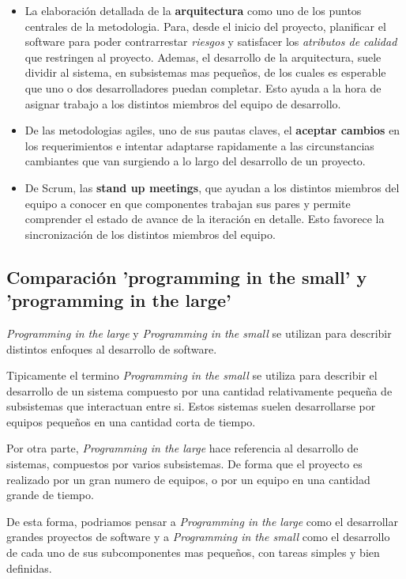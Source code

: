 \begin{itemize}
		\item La elaboración detallada de la \textbf{arquitectura} como uno de los puntos centrales de la metodologia. Para, desde el inicio del proyecto, planificar el software para poder contrarrestar \emph{riesgos} y satisfacer los \emph{atributos de calidad} que restringen al proyecto. Ademas, el desarrollo de la arquitectura, suele dividir al sistema, en subsistemas mas pequeños, de los cuales es esperable que uno o dos desarrolladores puedan completar. Esto ayuda a la hora de asignar trabajo a los distintos miembros del equipo de desarrollo.

		\item De las metodologias agiles, uno de sus pautas claves, el \textbf{aceptar cambios} en los requerimientos e intentar adaptarse rapidamente a las circunstancias cambiantes que van surgiendo a lo largo del desarrollo de un proyecto.

		\item De Scrum, las \textbf{stand up meetings}, que ayudan a los distintos miembros del equipo a conocer en que componentes trabajan sus pares y permite comprender el estado de avance de la iteración en detalle. Esto favorece la sincronización de los distintos miembros del equipo.

	\end{itemize}

\subsection{Comparación 'programming in the small' y 'programming in the large'}

	\newcommand{\pil}{
		\emph{Programming in the large}
	}

	\newcommand{\pis}{
		\emph{Programming in the small}
	}

	\pil y \pis se utilizan para describir distintos enfoques al desarrollo de software.

	Tipicamente el termino \pis se utiliza para describir el desarrollo de un sistema compuesto por una cantidad relativamente pequeña de subsistemas que interactuan entre si. Estos sistemas suelen desarrollarse por equipos pequeños en una cantidad corta de tiempo.

	Por otra parte, \pil hace referencia al desarrollo de sistemas, compuestos por varios subsistemas. De forma que el proyecto es realizado por un gran numero de equipos, o por un equipo en una cantidad grande de tiempo.

	De esta forma, podriamos pensar a \pil como el desarrollar grandes proyectos de software y a \pis como el desarrollo de cada uno de sus subcomponentes mas pequeños, con tareas simples y bien definidas.

